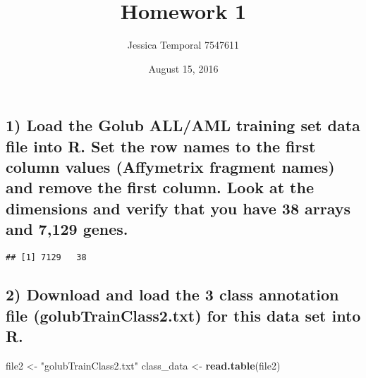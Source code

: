 \documentclass[]{article}
\title{Homework 1}
\author{Jessica Temporal 7547611}
\date{August 15, 2016}
\newenvironment{Shaded}{\begin{snugshade}}{\end{snugshade}}
\newcommand{\KeywordTok}[1]{\textcolor[rgb]{0.13,0.29,0.53}{\textbf{{#1}}}}
\newcommand{\DataTypeTok}[1]{\textcolor[rgb]{0.13,0.29,0.53}{{#1}}}
\newcommand{\DecValTok}[1]{\textcolor[rgb]{0.00,0.00,0.81}{{#1}}}
\newcommand{\StringTok}[1]{\textcolor[rgb]{0.31,0.60,0.02}{{#1}}}
\newcommand{\OtherTok}[1]{\textcolor[rgb]{0.56,0.35,0.01}{{#1}}}
\newcommand{\NormalTok}[1]{{#1}}
\begin{document}
\maketitle

{
\setcounter{tocdepth}{3}
\tableofcontents
}
\newpage

\subsection{1) Load the Golub ALL/AML training set data file into R. Set
the row names to the first column values (Affymetrix fragment names) and
remove the first column. Look at the dimensions and verify that you have
38 arrays and 7,129
genes.}\label{load-the-golub-allaml-training-set-data-file-into-r.-set-the-row-names-to-the-first-column-values-affymetrix-fragment-names-and-remove-the-first-column.-look-at-the-dimensions-and-verify-that-you-have-38-arrays-and-7129-genes.}

\begin{Shaded}
\end{Shaded}

\begin{verbatim}
## [1] 7129   38
\end{verbatim}

\subsection{2) Download and load the 3 class annotation file
(golubTrainClass2.txt) for this data set into
R.}\label{download-and-load-the-3-class-annotation-file-golubtrainclass2.txt-for-this-data-set-into-r.}

\begin{Shaded}
\begin{Highlighting}[]
\NormalTok{file2 <-}\StringTok{ "golubTrainClass2.txt"}
\NormalTok{class_data <-}\StringTok{ }\KeywordTok{read.table}\NormalTok{(file2)}
\end{Highlighting}
\end{Shaded}
\end{document}
